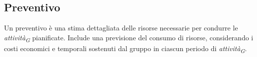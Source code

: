 \subsection{Preventivo}
Un preventivo è una stima dettagliata delle risorse necessarie per condurre le \textit{attività}\textsubscript{\textit{G}} pianificate. Include una previsione del consumo di risorse, considerando i costi economici e temporali sostenuti dal gruppo in ciascun periodo di \textit{attività}\textsubscript{\textit{G}}.